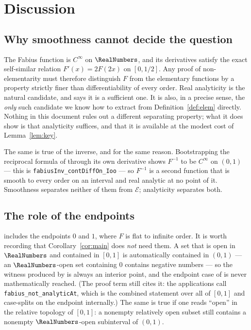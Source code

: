 \documentclass[11pt,oneside]{article}
\theoremstyle{definition}
\theoremstyle{remark}
\newcommand{\Elem}{\mathcal E}
\begin{document}
\section{Discussion}

\subsection{Why smoothness cannot decide the question}

The Fabius function is $C^\infty$ on $\RealNumbers$, and its derivatives satisfy the
exact self-similar relation $F'(x)=2F(2x)$ on $[0,1/2]$.  Any proof of
non-elementarity must therefore distinguish $F$ from the elementary functions
by a property strictly finer than differentiability of every order.  Real
analyticity is the natural candidate, and  says it is a
sufficient one.  It is also, in a precise sense, the \emph{only} such
candidate we know how to extract from Definition~\ref{def:elem} directly.  Nothing in
this document rules out a different separating property; what it does show is
that analyticity suffices, and that it is available at the modest cost of
Lemma~\ref{lem:key}.

The same is true of the inverse, and for the same reason.  Bootstrapping the
reciprocal formula of  through its own derivative shows
$F^{-1}$ to be $C^{\infty}$ on $(0,1)$ --- this is
\texttt{fabiusInv\_contDiffOn\_Ioo} --- so $F^{-1}$ is a second function that
is smooth to every order on an interval and real analytic at no point of it.
Smoothness separates neither of them from $\Elem$; analyticity separates both.

\subsection{The role of the endpoints}

 includes the endpoints $0$ and $1$, where $F$ is flat to
infinite order.  It is worth recording that Corollary~\ref{cor:main} does \emph{not}
need them.  A set that is open in $\RealNumbers$ and contained in $[0,1]$ is
automatically contained in $(0,1)$ --- an $\RealNumbers$-open set containing $0$
contains negative numbers --- so the witness produced by
 is always an interior point, and the endpoint case of
 is never mathematically reached.  (The proof term still
cites it: the applications call \texttt{fabius\_not\_analyticAt}, which is the
combined statement over all of $[0,1]$ and case-splits on the endpoint
internally.)  The same is true if one reads ``open''
in the relative topology of $[0,1]$: a nonempty relatively open subset still
contains a nonempty $\RealNumbers$-open subinterval of $(0,1)$.
\end{document}
